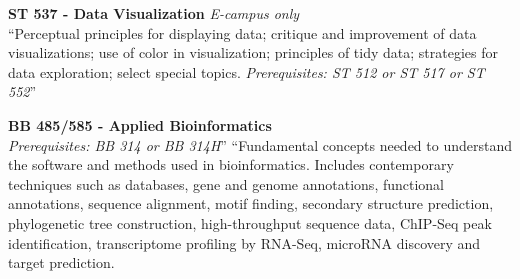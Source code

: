 \documentclass[10pt]{article}
\begin{document}
\noindent
\textbf{ST 537 - Data Visualization} \emph{E-campus only}\\
``Perceptual principles for displaying data; critique and improvement of data visualizations; use of color in visualization; principles of tidy data; strategies for data exploration; select special topics. \emph{Prerequisites: ST 512 or ST 517 or ST 552}''

\noindent
\textbf{BB 485/585 - Applied Bioinformatics}\\
 \emph{Prerequisites: BB 314 or BB 314H}''
``Fundamental concepts needed to understand the software and methods used in bioinformatics. Includes contemporary techniques such as databases, gene and genome annotations, functional annotations, sequence alignment, motif finding, secondary structure prediction, phylogenetic tree construction, high-throughput sequence data, ChIP-Seq peak identification, transcriptome profiling by RNA-Seq, microRNA discovery and target prediction.
\end{document}
